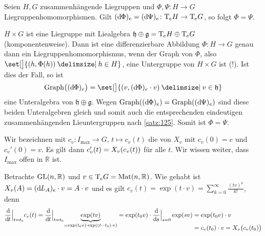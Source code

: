 \begin{korollar}[label=kor:126,{name=[gleiche induzierte Liealgebrenhom. implizieren Gleichheit der Liegruppenhom.]}]
	Seien $H,G$ zusammenhängende Liegruppen und $\Phi, \Psi \colon H \to G$ Liegruppenhomomorphismen.
	Gilt $(\mathd \Phi)_e = (\mathd \Psi)_e \colon \Tmap_e H \to \Tmap_e G$, so folgt $\Phi = \Psi$.
\end{korollar}
\begin{beweis}
	$H \times G$ ist eine Liegruppe mit Liealgebra $\mathfrak{h} \oplus \mathfrak{g}= \Tmap_e H \oplus \Tmap_e G$ (komponentenweise).
	Dann ist eine differenzierbare Abbildung $\Phi \colon H \to G$ genau dann ein Liegruppenhomomorphismus, wenn der Graph von $\Phi$, also $\set[\big]{(h,\Phi(h)) \given h \in H}$, eine Untergruppe von $H \times G $ ist (!).
	Ist dies der Fall, so ist 
	\[
		\Graph \enbrace[\big]{(\mathd \Phi)_e} = \set[\big]{ \enbrace*{v, (\mathd \Phi)_e \cdot v} \given v \in \mathfrak{h}}
	\]
	eine Unteralgebra von $\mathfrak{h} \oplus \mathfrak{g}$.
	Wegen $\Graph \enbrace*{(\mathd \Phi)_e} = \Graph \enbrace*{(\mathd \Psi)_e}$ sind diese beiden Unteralgebren gleich und somit auch die entsprechenden eindeutigen zusammenhängenden Lieuntergruppen nach \autoref{satz:125}.
	Somit ist $\Phi =\Psi$.
\end{beweis}

Wir bezeichnen mit $c_v \colon I_{\max} \to G$, $t \mapsto c_v(t)$ die  von $X_v$ mit $c_v(0)=e$ und $c_v'(0)=v$.
Es gilt dann $c_v'(t) = X_v \enbrace*{c_v(t)}$ für alle $t$.
Wir wissen weiter, dass $I_{\max}$ offen in $\mathbb{R}$ ist.

\begin{beispiel*}[{name=[{maximale Integralkurve in der allgemeinen linearen Gruppe}]}]
	Betrachte $\GL(n,\mathbb{R})$ und $v \in \Tmap_e G = \Mat(n,\mathbb{R})$.
	Wie gehabt ist $X_v(A) = (\mathd L_A)_e \cdot v = A \cdot v$ und es gilt $c_v(t)= \exp(t \cdot v) = \sum_{k=0}^{\infty} \frac{(tv)^k}{k!}$, denn
	\begin{align}
		\diffd{}{t}\Big|_{t=t_0} c_v(t) = \diffd{}{t}\Big|_{t=t_0} \Underbrace{\exp(t v)}{=\exp(t_0 v) \cdot \exp((t-t_0) \cdot v)} 
		= \exp(t_0 v) \cdot \diffd{}{s}\Big|_{s=0} \exp(s v)
		&= \exp(t_0 v) \cdot v \\[-1em]
		&= c_v(t_0) \cdot v = X_v \enbrace[\big]{c_v(t_0)}
	\end{align}
\end{beispiel*}


